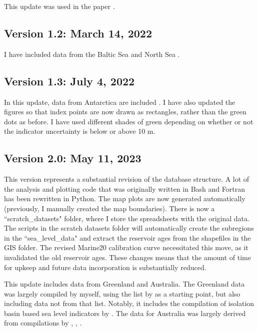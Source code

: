 This update was used in the paper \citet{GowanEta2022}.

\subsection{Version 1.2: March 14, 2022}

I have included data from the Baltic Sea \citep{RosentauEtal2021} and North Sea \citep{VinkEtal2007}.

\subsection{Version 1.3: July 4, 2022}

In this update, data from Antarctica are included \citep{BriggsTarasov2013,IshiwaEtal2021}. I have also updated the figures so that index points are now drawn as rectangles, rather than the green dots as before. I have used different shades of green depending on whether or not the indicator uncertainty is below or above 10 m.

\subsection{Version 2.0: May 11, 2023}

This version represents a substantial revision of the database structure. A lot of the analysis and plotting code that was originally written in Bash and Fortran has been rewritten in Python. The map plots are now generated automatically (previously, I manually created the map boundaries). There is now a ``scratch\_datasets" folder, where I store the spreadsheets with the original data. The scripts in the scratch datasets folder will automatically create the subregions in the ``sea\_level\_data" and extract the reservoir ages from the shapefiles in the GIS folder. The revised Marine20 calibration curve necessitated this move, as it invalidated the old reservoir ages. These changes means that the amount of time for upkeep and future data incorporation is substantially reduced.

This update includes data from Greenland and Australia. The Greenland data was largely compiled by myself, using the list by \citet{LecavalierEtal2014} as a starting point, but also including data not from that list. Notably, it includes the compilation of isolation basin based sea level indicators by \citet{LongEtal2011}. The data for Australia was largely derived from compilations by \citet{LewisEtal2013}, \citet{SlossEtal2007}, \citet{BelperioEtal2002}.

